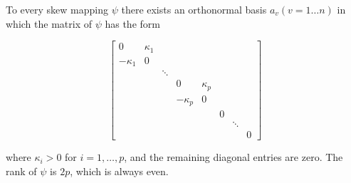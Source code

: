 To every skew mapping $\psi$ there exists an orthonormal basis $a_v (v = 1 \dots n)$ in which the matrix of $\psi$ has the form

$$\begin{bmatrix}
0 & \kappa_1 \\
-\kappa_1 & 0 \\
& & \ddots \\
& & & 0 & \kappa_p \\
& & & -\kappa_p & 0 \\
& & & & & 0 \\
& & & & & & \ddots \\
& & & & & & & 0
\end{bmatrix}$$

where $\kappa_i > 0$ for $i = 1, \dots, p$, and the remaining diagonal entries are zero. The rank of $\psi$ is $2p$, which is always even.
